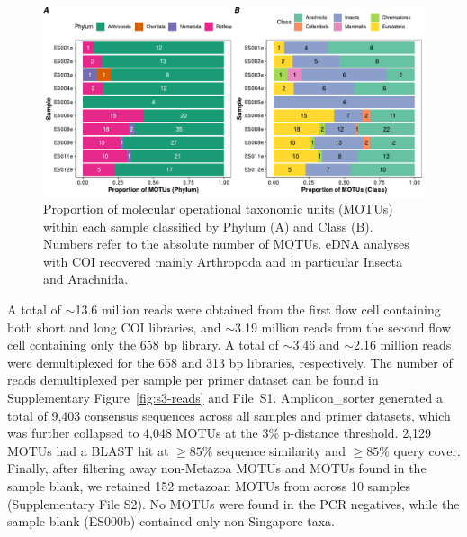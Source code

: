 \begin{figure}[tb]
    \centering
    \includegraphics[width=\linewidth]{figures/05_motus.pdf}
    \caption{Proportion of molecular operational taxonomic units (MOTUs) within each sample classified by Phylum (A) and Class (B). Numbers refer to the absolute number of \glspl{MOTU}. \gls{eDNA} analyses with COI recovered mainly Arthropoda and in particular Insecta and Arachnida.}
    \label{fig:5-barplot}
\end{figure}

A total of $\sim$13.6 million reads were obtained from the first flow cell containing both short and long COI libraries, and $\sim$3.19 million reads from the second flow cell containing only the 658 bp library. A total of $\sim$3.46 and $\sim$2.16 million reads were demultiplexed for the 658 and 313 bp libraries, respectively. The number of reads demultiplexed per sample per primer dataset can be found in Supplementary Figure~\ref{fig:s3-reads} and File~S1. Amplicon\_sorter generated a total of 9,403 consensus sequences across all samples and primer datasets, which was further collapsed to 4,048 \glspl{MOTU} at the 3\% p-distance threshold. 2,129 \glspl{MOTU} had a BLAST hit at $\geq 85 \%$ sequence similarity and $\geq 85 \%$ query cover. Finally, after filtering away non-Metazoa \glspl{MOTU} and \glspl{MOTU} found in the sample blank, we retained 152 metazoan \glspl{MOTU} from across 10 samples (Supplementary File S2). No \glspl{MOTU} were found in the PCR negatives, while the sample blank (ES000b) contained only non-Singapore taxa.


